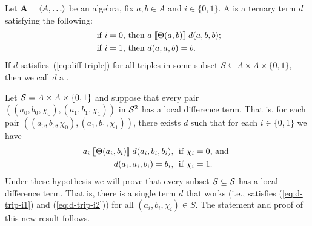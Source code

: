 Let $\bA=\< A, \dots\>$ be an algebra, fix $a, b \in A$ and
$i \in \{0,1\}$.
A  is a ternary term $d$ satisfying the following:
\begin{align}
\text{ if $i=0$, then } & a \comr{\Cg(a,b)} d(a,b,b); \label{eq:diff-triple}\\
\text{ if $i=1$, then } &d(a,a,b) = b. \nonumber
\end{align}
If $d$ satisfies~(\ref{eq:diff-triple}) for all triples
in some subset $S\subseteq A \times A \times \{0,1\}$, then we call $d$
a .

Let 
$\mathcal{S} = A \times A \times \{0,1\}$ and
suppose that every pair
$((a_0, b_0, \chi_0), (a_1, b_1, \chi_1))$
in $\mathcal{S}^2$ has a local difference term.
That is, for each pair $((a_0, b_0, \chi_0), (a_1, b_1, \chi_1))$, there exists
$d$ such that for each $i \in \{0,1\}$ we have
\begin{align}
  a_i \comr{\Cg(a_i,b_i)} d(a_i,b_i,b_i), & \;
  \text{ if $\chi_i=0$, and }  \label{eq:d-trip-i1}\\
  d(a_i,a_i,b_i) =b_i, & \;
  \text{ if $\chi_i=1$.}\label{eq:d-trip-i2} %
\end{align}
Under these hypothesis we will prove that every subset $S\subseteq \mathcal{S}$
has a local difference term.
That is, there is a single term $d$ that works (i.e., satisfies
(\ref{eq:d-trip-i1}) and (\ref{eq:d-trip-i2})) for all $(a_i, b_i, \chi_i) \in S$.
The statement and proof of this new result follows.

